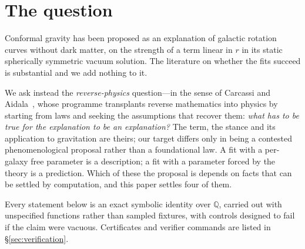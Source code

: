\documentclass[11pt]{article}
\theoremstyle{definition}
\theoremstyle{remark}
\begin{document}
\begin{abstract}
What the assembly gives is a map of the assumption rather than a result.  The
linear coefficient decomposes as \(\gamma=\gamma_{0}+\gamma_{*}(M)\), a
boundary datum plus a sourced piece, which is the parametrisation the
rotation-curve fits already use~\cite{MannheimOBrien2012}.  That sits awkwardly
with our own Tully--Fisher conditional, which says a mass-proportional piece
moves the slope, whereas those fits retain both terms and report success over
a large sample.  We record it as an unresolved tension between a premise we
adopt and a fit we do not evaluate.  The underlying dispute is live and more
than a decade old~\cite{Horne2016,HobsonLasenby2021,Mannheim2022,%
HobsonLasenby2022}, and its crux is not algebraic: both sides agree on the
transformation law and disagree over whether the mass-generating scalar is
macroscopic or microscopic.  Exact computation takes such premises as input.
It cannot settle this one, and we do not pretend otherwise.
\end{abstract}

\section{The question}

Conformal gravity has been proposed as an explanation of galactic rotation
curves without dark matter, on the strength of a term linear in \(r\) in its
static spherically symmetric vacuum solution.  The literature on whether the
fits succeed is substantial and we add nothing to it.

We ask instead the \emph{reverse-physics} question---in the sense of Carcassi
and Aidala~\cite{CarcassiAidala2022,AoP}, whose programme transplants reverse
mathematics into physics by starting from laws and seeking the assumptions
that recover them: \emph{what has to be true for the explanation to be an
explanation?}  The term, the stance and its application to gravitation are
theirs; our target differs only in being a contested phenomenological
proposal rather than a foundational law.  A fit with a per-galaxy free
parameter is a description; a fit with a parameter forced by the theory is a
prediction.  Which of these the proposal is depends on facts that can be
settled by computation, and this paper settles four of them.

Every statement below is an exact symbolic identity over \(\mathbb{Q}\),
carried out with unspecified functions rather than sampled fixtures, with
controls designed to fail if the claim were vacuous.  Certificates and
verifier commands are listed in \S\ref{sec:verification}.
\end{document}
